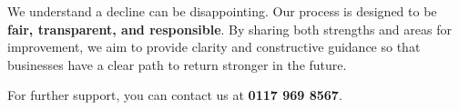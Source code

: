 \documentclass[a4paper,12pt]{article} %
\begin{document}
\bigskip
\noindent %
\makebox[\linewidth]{\rule{\textwidth}{0.4pt}} %
\bigskip

\bigskip

\noindent We understand a decline can be disappointing. Our process is designed to be {\bf fair, transparent, and responsible}. By sharing both strengths and areas for improvement, we aim to provide clarity and constructive guidance so that businesses have a clear path to return stronger in the future.\smallskip

\noindent For further support, you can contact us at {\bf 0117 969 8567}.
\end{document}
